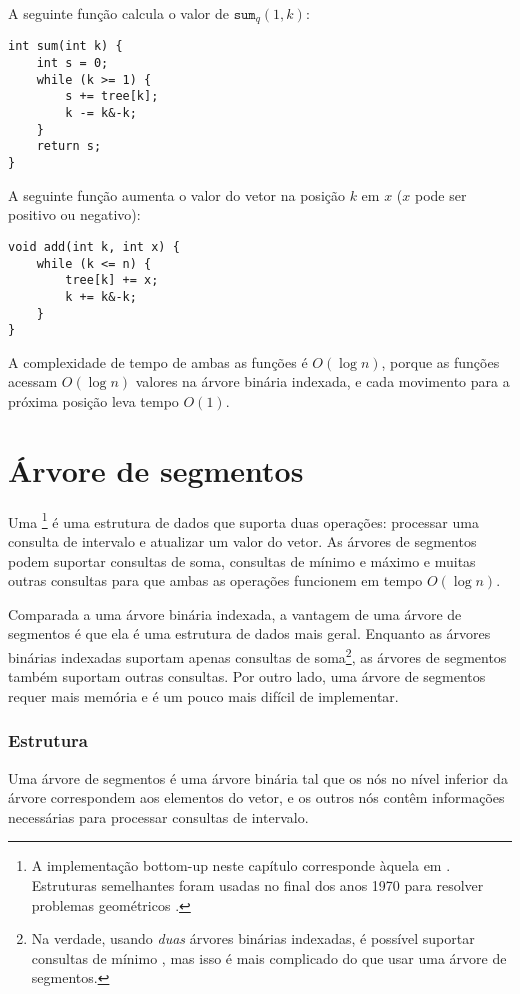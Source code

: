 A seguinte função calcula o valor de $\texttt{sum}_q(1,k)$:
\begin{lstlisting}
int sum(int k) {
    int s = 0;
    while (k >= 1) {
        s += tree[k];
        k -= k&-k;
    }
    return s;
}
\end{lstlisting}

A seguinte função aumenta o
valor do vetor na posição $k$ em $x$
($x$ pode ser positivo ou negativo):
\begin{lstlisting}
void add(int k, int x) {
    while (k <= n) {
        tree[k] += x;
        k += k&-k;
    }
}
\end{lstlisting}

A complexidade de tempo de ambas as funções é
$O(\log n)$, porque as funções acessam $O(\log n)$
valores na árvore binária indexada, e cada movimento
para a próxima posição leva tempo $O(1)$.

\section{Árvore de segmentos}


Uma \footnote{A implementação bottom-up neste capítulo corresponde
àquela em \cite{sta06}. Estruturas semelhantes foram usadas
no final dos anos 1970 para resolver problemas geométricos \cite{ben80}.} é uma estrutura de dados
que suporta duas operações:
processar uma consulta de intervalo e
atualizar um valor do vetor.
As árvores de segmentos podem suportar
consultas de soma, consultas de mínimo e máximo e muitas outras
consultas para que ambas as operações funcionem em tempo $O(\log n)$.

Comparada a uma árvore binária indexada,
a vantagem de uma árvore de segmentos é que ela é
uma estrutura de dados mais geral.
Enquanto as árvores binárias indexadas suportam apenas
consultas de soma\footnote{Na verdade, usando \emph{duas} árvores binárias 
indexadas, é possível suportar consultas de mínimo \cite{dim15},
mas isso é mais complicado do que usar uma árvore de segmentos.},
as árvores de segmentos também suportam outras consultas.
Por outro lado, uma árvore de segmentos requer mais
memória e é um pouco mais difícil de implementar.

\subsubsection{Estrutura}

Uma árvore de segmentos é uma árvore binária
tal que os nós no nível inferior da árvore
correspondem aos elementos do vetor,
e os outros nós
contêm informações necessárias para processar consultas de intervalo.

